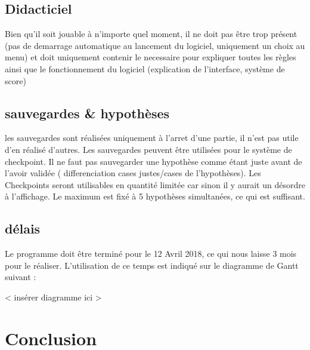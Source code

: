 \documentclass{report}
\begin{document}
	\section{Didacticiel}
		Bien qu'il soit jouable à n'importe quel moment, il ne doit pas être trop présent (pas de demarrage automatique au lancement du logiciel, uniquement un choix au menu) et doit uniquement contenir le necessaire pour expliquer toutes les règles ainsi que le fonctionnement du logiciel (explication de l'interface, système de score)
	
	\section{sauvegardes & hypothèses}
		les sauvegardes sont réalisées uniquement à l'arret d'une partie, il n'est pas utile d'en réalisé d'autres. Les sauvegardes peuvent être utilisées pour le système de checkpoint. Il ne faut pas sauvegarder une hypothèse comme étant juste avant de l'avoir validée ( differenciation cases justes/cases de l'hypothèses). Les Checkpoints seront utilisables en quantité limitée car sinon il y aurait un désordre à l'affichage. Le maximum est fixé à 5 hypothèses simultanées, ce qui est suffisant.
		
	
	\section{délais}
		Le programme doit être terminé pour le 12 Avril 2018, ce qui nous laisse 3 mois pour le réaliser. L'utilisation de ce temps est indiqué sur le diagramme de Gantt suivant :
		
		< insérer diagramme ici >
		
		
\chapter{Conclusion}
		
		
\end{document}
